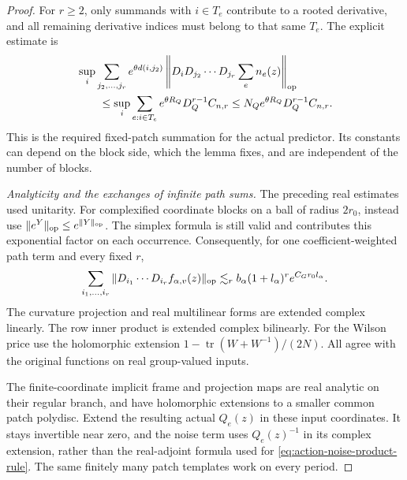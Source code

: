 \documentclass[11pt,reqno]{amsart}
\numberwithin{equation}{section}
\theoremstyle{definition}
\theoremstyle{remark}
\DeclareMathOperator{\tr}{tr}
\begin{document}
\begin{proof}
For \(r\ge2\), only summands with \(i\in T_e\) contribute
to a rooted derivative, and all remaining derivative indices
must belong to that same \(T_e\). The explicit estimate is
\begin{equation}
 \begin{split}
 &\sup_i\sum_{j_2,\ldots,j_r}e^{\theta d(i,j_2)}
       \left\|D_iD_{j_2}\cdots D_{j_r}\sum_e n_e(z)\right\|_{\rm op}\\
 &\qquad\le
 \sup_i\sum_{e:i\in T_e}e^{\theta R_Q}D_Q^{r-1}C_{n,r}
                 \le N_Qe^{\theta R_Q}D_Q^{r-1}C_{n,r}.
 \end{split}
 \label{eq:action-noise-rooted-sums}
\end{equation}
This is the required fixed-patch summation for the actual
predictor. Its constants can depend on the block side, which
the lemma fixes, and are independent of the number of blocks.

\smallskip\noindent
\emph{Analyticity and the exchanges of infinite path sums.}
The preceding real estimates used unitarity. For complexified
coordinate blocks on a ball of radius \(2r_0\), instead use
\(\|e^Y\|_{\rm op}\le e^{\|Y\|_{\rm op}}\).
The simplex formula is still valid and contributes this
exponential factor on each occurrence. Consequently, for
one coefficient-weighted path term and every fixed \(r\),
\begin{equation}
 \sum_{i_1,\ldots,i_r}
        \|D_{i_1}\cdots D_{i_r}f_{\alpha,v}(z)\|_{\rm op}
     \lesssim_r b_\alpha(1+l_\alpha)^r e^{C_Gr_0l_\alpha}.
 \label{eq:word-local-derivative-cost}
\end{equation}
The curvature projection and real multilinear forms are
extended complex linearly. The row inner product is extended
complex bilinearly. For the Wilson price use the holomorphic
extension \(1-\tr(W+W^{-1})/(2N)\). All agree with the
original functions on real group-valued inputs.

The finite-coordinate implicit frame and projection maps
are real analytic on their regular branch, and have
holomorphic extensions to a smaller common patch polydisc.
Extend the resulting actual \(Q_e(z)\) in these input
coordinates. It stays invertible near zero, and the noise
term uses \(Q_e(z)^{-1}\) in its complex extension, rather
than the real-adjoint formula used for
\eqref{eq:action-noise-product-rule}. The same finitely
many patch templates work on every period.


\end{proof}
\end{document}

